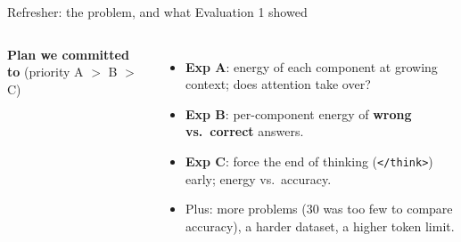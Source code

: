 \documentclass[aspectratio=169,9pt]{beamer}
\newcommand{\think}{\texttt{\textless/think\textgreater}}
\newcommand{\hd}[1]{{\color{accent}\bfseries #1}}
\begin{document}
\begin{frame}{Refresher: the problem, and what Evaluation 1 showed}
\begin{columns}[T,onlytextwidth]
    \hd{Plan we committed to} {\scriptsize\color{muted}(priority A $>$ B $>$ C)}
    \begin{itemize}\scriptsize\setlength{\itemsep}{1pt}
      \item \textbf{Exp A}: energy of each component at growing context; does attention take over?
      \item \textbf{Exp B}: per-component energy of \textbf{wrong vs.\ correct} answers.
      \item \textbf{Exp C}: force the end of thinking (\think) early; energy vs.\ accuracy.
      \item Plus: more problems (30 was too few to compare accuracy), a harder dataset, a higher token limit.
    \end{itemize}
  \end{columns}
\end{frame}
\end{document}
